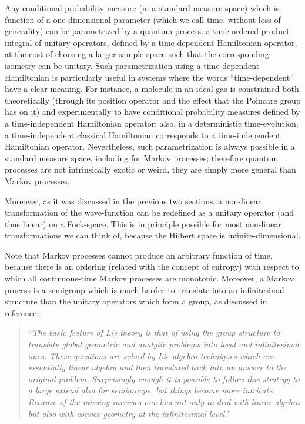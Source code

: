 \documentclass[11pt]{book}
\begin{document}
Any conditional probability measure (in a standard measure space) which
is function of a one-dimensional parameter (which we call time, without
loss of generality) can be parametrized by a quantum process: a
time-ordered product integral of unitary operators, defined by a
time-dependent Hamiltonian operator, at the cost of choosing a larger
sample space such that the corresponding isometry can be unitary. Such
parametrization using a time-dependent Hamiltonian is particularly
useful in systems where the words ``time-dependent'' have a clear
meaning. For instance, a molecule in an ideal gas is constrained both
theoretically (through its position operator and the effect that the
Poincare group has on it) and experimentally to have conditional
probability measures defined by a time-independent Hamiltonian operator;
also, in a deterministic time-evolution, a time-independent classical
Hamiltonian corresponds to a time-independent Hamiltonian operator.
Nevertheless, such parametrization is always possible in a standard
measure space, including for Markov processes; therefore quantum
processes are not intrinsically exotic or weird, they are simply more
general than Markov processes.

Moreover, as it was discussed in the previous two sections, a non-linear
transformation of the wave-function can be redefined as a unitary
operator (and thus linear) on a Fock-space. This is in principle
possible for most non-linear transformations we can think of, because
the Hilbert space is infinite-dimensional.

Note that Markov processes cannot produce an arbitrary function of time,
because there is an ordering (related with the concept of entropy) with
respect to which all continuous-time Markov processes are
monotonic\cite{2010entropy}. Moreover, a Markov process is a semigroup which is much harder
to translate into an infinitesimal structure than the unitary operators
which form a group, as discussed in
reference\cite{hilgert2006lie}:

\begin{quote}
``\emph{The basic feature of Lie theory is that of using the group
structure to translate global geometric and analytic problems into local
and infinitesimal ones. These questions are solved by Lie algebra
techniques which are essentially linear algebra and then translated back
into an answer to the original problem. Surprisingly enough it is
possible to follow this strategy to a large extend also for semigroups,
but things become more intricate. Because of the missing inverses one
has not only to deal with linear algebra but also with convex geometry
at the infinitesimal level.}''
\end{quote}
\end{document}
